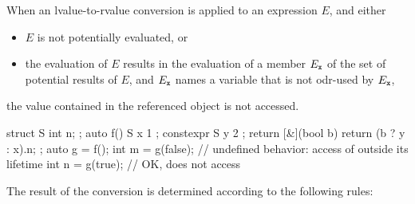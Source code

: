 \pnum
When an lvalue-to-rvalue conversion
is applied to an expression $E$, and either
\begin{itemize}
\item $E$ is not potentially evaluated, or
\item the evaluation of $E$ results in the evaluation of a member
      $E_{\texttt{\protect x}}$ of the set of potential results of $E$, and $E_{\texttt{\protect x}}$
      names a variable  that is not odr-used by
      $E_{\texttt{\protect x}}$,
\end{itemize}
the value contained in the referenced object is not accessed.
\begin{example}
\begin{codeblock}
struct S { int n; };
auto f() {
  S x { 1 };
  constexpr S y { 2 };
  return [&](bool b) { return (b ? y : x).n; };
}
auto g = f();
int m = g(false);   // undefined behavior: access of  outside its lifetime
int n = g(true);    // OK, does not access 
\end{codeblock}
\end{example}

\pnum
The result of the conversion is determined according to the
following rules:


